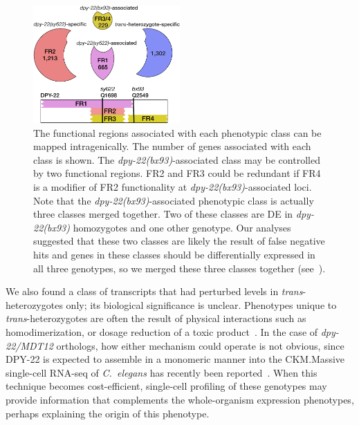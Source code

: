 \documentclass[8pt, twocolumn]{article}
\newcommand{\cel}{\emph{C.~elegans}}
\newcommand{\gene}[1]{\mbox{\emph{#1}}}
\newcommand{\protein}[1]{\mbox{\uppercase{#1}}}
\newcommand{\dpy}[1]{\gene{dpy-22#1}}
\newcommand{\bx}{\dpy{(bx93)}}
\begin{document}
\begin{figure}
  \centering{}
  \includegraphics[width=0.5\textwidth]{../figs/inferred_domains.pdf}
  \caption{
          The functional regions associated with each phenotypic class can be
          mapped intragenically. The number of genes associated with each class
          is shown. The \bx{}-associated class may be controlled by two
          functional regions. FR2 and FR3 could be redundant if FR4 is a
          modifier of FR2 functionality at \bx{}-associated loci. Note that the
          \bx{}-associated phenotypic class is actually three classes merged
          together. Two of these classes are DE in \bx{} homozygotes and one
          other genotype. Our analyses suggested that these two classes are
          likely the result of false negative hits and genes in these classes
          should be differentially expressed in all three genotypes, so we
          merged these three classes together (see~).
  }
\label{fig:domains}
\end{figure}

We also found a class of transcripts that had perturbed levels in
\emph{trans}-heterozygotes only; its biological significance is unclear.
Phenotypes unique to \emph{trans}-heterozygotes are often the result of physical
interactions such as homodimerization, or dosage reduction of a toxic
product~\cite{Yook2005}. In the case of \dpy{/MDT12} orthologs, how either
mechanism could operate is not obvious, since \protein{dpy-22} is expected to
assemble in a monomeric manner into the CKM.\@ Massive single-cell RNA-seq of
\cel{} has recently been reported~\cite{Cao2017}. When this technique becomes
cost-efficient, single-cell profiling of these genotypes may provide information
that complements the whole-organism expression phenotypes, perhaps explaining
the origin of this phenotype.
\end{document}
